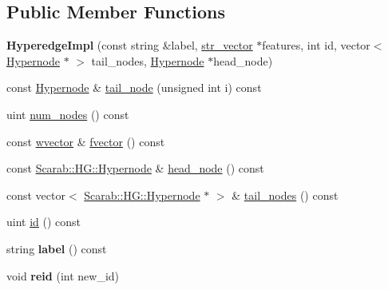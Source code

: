 \subsection*{Public Member Functions}
\begin{DoxyCompactItemize}
\item 
\hypertarget{classScarab_1_1HG_1_1HyperedgeImpl_a3c141efe1be2e8ee78d45caca4711c6e}{
{\bfseries HyperedgeImpl} (const string \&label, \hyperlink{classsvector}{str\_\-vector} $\ast$features, int id, vector$<$ \hyperlink{classScarab_1_1HG_1_1Hypernode}{Hypernode} $\ast$ $>$ tail\_\-nodes, \hyperlink{classScarab_1_1HG_1_1Hypernode}{Hypernode} $\ast$head\_\-node)}
\label{classScarab_1_1HG_1_1HyperedgeImpl_a3c141efe1be2e8ee78d45caca4711c6e}

\item 
const \hyperlink{classScarab_1_1HG_1_1Hypernode}{Hypernode} \& \hyperlink{classScarab_1_1HG_1_1HyperedgeImpl_a7087ba121f3056eb5946d1909c4b3d58}{tail\_\-node} (unsigned int i) const 
\item 
uint \hyperlink{classScarab_1_1HG_1_1HyperedgeImpl_a9a5bef8789c9c7caee6f53833ea4acc7}{num\_\-nodes} () const 
\item 
const \hyperlink{classsvector}{wvector} \& \hyperlink{classScarab_1_1HG_1_1HyperedgeImpl_a359446c285164a93995bb87e6ea74882}{fvector} () const 
\item 
const \hyperlink{classScarab_1_1HG_1_1Hypernode}{Scarab::HG::Hypernode} \& \hyperlink{classScarab_1_1HG_1_1HyperedgeImpl_ae194bfc8ecac2a12791fa36c1c2c62a7}{head\_\-node} () const 
\item 
const vector$<$ \hyperlink{classScarab_1_1HG_1_1Hypernode}{Scarab::HG::Hypernode} $\ast$ $>$ \& \hyperlink{classScarab_1_1HG_1_1HyperedgeImpl_a3bf00c8c032397150f59e196aea5e245}{tail\_\-nodes} () const 
\item 
uint \hyperlink{classScarab_1_1HG_1_1HyperedgeImpl_afa81943347267781c25c4e68f7f5f547}{id} () const 
\item 
\hypertarget{classScarab_1_1HG_1_1HyperedgeImpl_a8fe687c9914de37c4d91c353ba669665}{
string {\bfseries label} () const }
\label{classScarab_1_1HG_1_1HyperedgeImpl_a8fe687c9914de37c4d91c353ba669665}

\item 
\hypertarget{classScarab_1_1HG_1_1HyperedgeImpl_a068e4291cbcaa68a59ad64ede34f9edc}{
void {\bfseries reid} (int new\_\-id)}
\label{classScarab_1_1HG_1_1HyperedgeImpl_a068e4291cbcaa68a59ad64ede34f9edc}

\end{DoxyCompactItemize}
